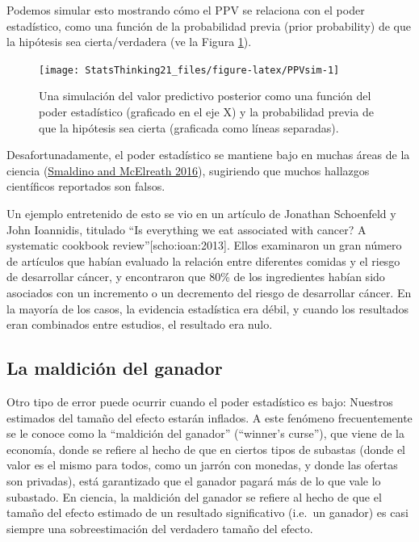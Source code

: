 \documentclass[
  12pt,
]{book}
\theoremstyle{definition}
\theoremstyle{definition}
\theoremstyle{definition}
\theoremstyle{remark}
\begin{document}
Podemos simular esto mostrando cómo el PPV se relaciona con el poder estadístico, como una función de la probabilidad previa (prior probability) de que la hipótesis sea cierta/verdadera (ve la Figura \ref{fig:PPVsim}).

\begin{figure}
\texttt{[image: StatsThinking21\_files/figure-latex/PPVsim-1]} \caption{Una simulación del valor predictivo posterior como una función del poder estadístico (graficado en el eje X) y la probabilidad previa de que la hipótesis sea cierta (graficada como líneas separadas).}\label{fig:PPVsim}
\end{figure}

Desafortunadamente, el poder estadístico se mantiene bajo en muchas áreas de la ciencia (\protect\hyperlink{ref-smal:mcel:2016}{Smaldino and McElreath 2016}), sugiriendo que muchos hallazgos científicos reportados son falsos.

Un ejemplo entretenido de esto se vio en un artículo de Jonathan Schoenfeld y John Ioannidis, titulado ``Is everything we eat associated with cancer? A systematic cookbook review''{[}scho:ioan:2013{]}. Ellos examinaron un gran número de artículos que habían evaluado la relación entre diferentes comidas y el riesgo de desarrollar cáncer, y encontraron que 80\% de los ingredientes habían sido asociados con un incremento o un decremento del riesgo de desarrollar cáncer. En la mayoría de los casos, la evidencia estadística era débil, y cuando los resultados eran combinados entre estudios, el resultado era nulo.

\hypertarget{la-maldiciuxf3n-del-ganador}{%
\subsection{La maldición del ganador}\label{la-maldiciuxf3n-del-ganador}}

Otro tipo de error puede ocurrir cuando el poder estadístico es bajo: Nuestros estimados del tamaño del efecto estarán inflados. A este fenómeno frecuentemente se le conoce como la ``maldición del ganador'' (``winner's curse''), que viene de la economía, donde se refiere al hecho de que en ciertos tipos de subastas (donde el valor es el mismo para todos, como un jarrón con monedas, y donde las ofertas son privadas), está garantizado que el ganador pagará más de lo que vale lo subastado. En ciencia, la maldición del ganador se refiere al hecho de que el tamaño del efecto estimado de un resultado significativo (i.e.~un ganador) es casi siempre una sobreestimación del verdadero tamaño del efecto.
\end{document}
